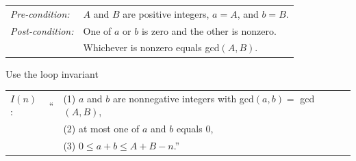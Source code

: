 \documentclass[14pt]{extarticle}
\begin{document}
\begin{tabular}{ll}
{\it Pre-condition:} & $A$ and $B$ are positive integers, $a = A$, and $b = B$. \\
{\it Post-condition:} & One of $a$ or $b$ is zero and the other is nonzero. \\
& Whichever is nonzero equals gcd$(A, B)$.
\end{tabular}

Use the loop invariant 

\begin{tabular}{lcl}
$I(n)$: & `` & (1) $a$ and $b$ are nonnegative integers with gcd$(a, b) = $ gcd$(A, B)$, \\
& & (2) at most one of $a$ and $b$ equals $0$, \\
& & (3) $0 \leq a + b \leq A + B - n$.''
\end{tabular}
\end{document}

